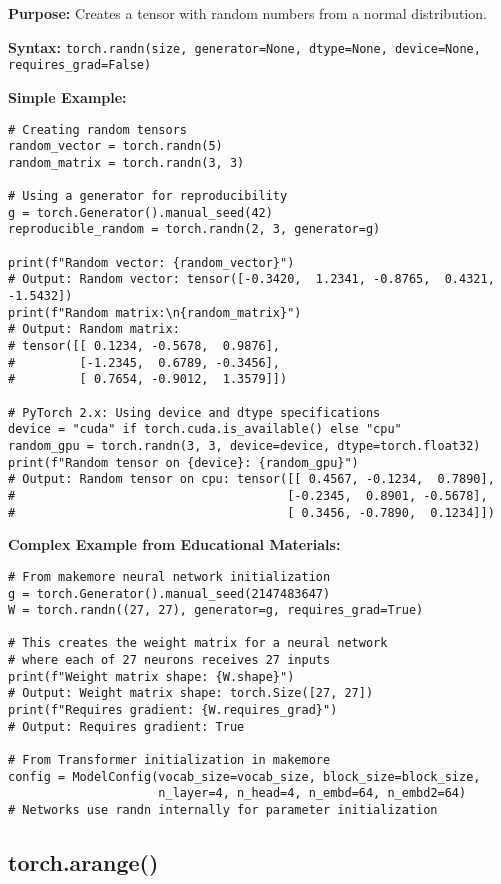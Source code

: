 \documentclass[11pt,a4paper]{book}
\begin{document}
\textbf{Purpose:} Creates a tensor with random numbers from a normal distribution.

\textbf{Syntax:} \texttt{torch.randn(size, generator=None, dtype=None, device=None, requires\_grad=False)}

\textbf{Simple Example:}
\begin{verbatim}
# Creating random tensors
random_vector = torch.randn(5)
random_matrix = torch.randn(3, 3)

# Using a generator for reproducibility
g = torch.Generator().manual_seed(42)
reproducible_random = torch.randn(2, 3, generator=g)

print(f"Random vector: {random_vector}")
# Output: Random vector: tensor([-0.3420,  1.2341, -0.8765,  0.4321, -1.5432])
print(f"Random matrix:\n{random_matrix}")
# Output: Random matrix:
# tensor([[ 0.1234, -0.5678,  0.9876],
#         [-1.2345,  0.6789, -0.3456],
#         [ 0.7654, -0.9012,  1.3579]])

# PyTorch 2.x: Using device and dtype specifications
device = "cuda" if torch.cuda.is_available() else "cpu"
random_gpu = torch.randn(3, 3, device=device, dtype=torch.float32)
print(f"Random tensor on {device}: {random_gpu}")
# Output: Random tensor on cpu: tensor([[ 0.4567, -0.1234,  0.7890],
#                                      [-0.2345,  0.8901, -0.5678],
#                                      [ 0.3456, -0.7890,  0.1234]])
\end{verbatim}

\textbf{Complex Example from Educational Materials:}
\begin{verbatim}
# From makemore neural network initialization
g = torch.Generator().manual_seed(2147483647)
W = torch.randn((27, 27), generator=g, requires_grad=True)

# This creates the weight matrix for a neural network
# where each of 27 neurons receives 27 inputs
print(f"Weight matrix shape: {W.shape}")
# Output: Weight matrix shape: torch.Size([27, 27])
print(f"Requires gradient: {W.requires_grad}")
# Output: Requires gradient: True

# From Transformer initialization in makemore
config = ModelConfig(vocab_size=vocab_size, block_size=block_size,
                     n_layer=4, n_head=4, n_embd=64, n_embd2=64)
# Networks use randn internally for parameter initialization
\end{verbatim}

\subsection{torch.arange()}
\end{document}
